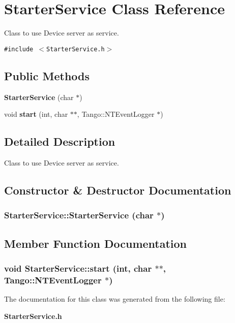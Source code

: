 \section{Starter\-Service  Class Reference}
\label{classStarterService}
Class to use Device server as service. 


{\tt \#include $<$Starter\-Service.h$>$}

\subsection*{Public Methods}
\begin{CompactItemize}
\item 
{\bf Starter\-Service} (char $\ast$)
\item 
void {\bf start} (int, char $\ast$$\ast$, Tango::NTEvent\-Logger $\ast$)
\end{CompactItemize}


\subsection{Detailed Description}
Class to use Device server as service.



\subsection{Constructor \& Destructor Documentation}
\subsubsection{\setlength{\rightskip}{0pt plus 5cm}Starter\-Service::Starter\-Service (char $\ast$)}\label{classStarterService_a0}




\subsection{Member Function Documentation}
\subsubsection{\setlength{\rightskip}{0pt plus 5cm}void Starter\-Service::start (int, char $\ast$$\ast$, Tango::NTEvent\-Logger $\ast$)}\label{classStarterService_a1}




The documentation for this class was generated from the following file:\begin{CompactItemize}
\item 
{\bf Starter\-Service.h}\end{CompactItemize}

